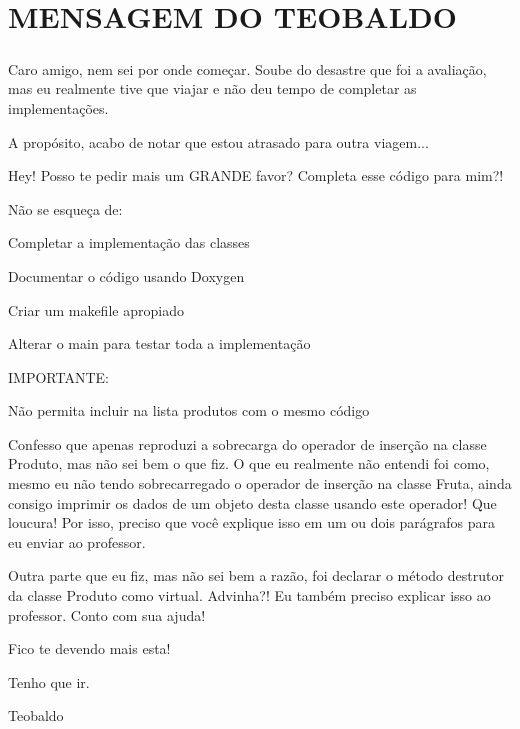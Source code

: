 \section*{M\+E\+N\+S\+A\+G\+EM DO T\+E\+O\+B\+A\+L\+DO}

\subparagraph*{}

Caro amigo, nem sei por onde começar. Soube do desastre que foi a avaliação, mas eu realmente tive que viajar e não deu tempo de completar as implementações.

A propósito, acabo de notar que estou atrasado para outra viagem...

Hey! Posso te pedir mais um G\+R\+A\+N\+DE favor? Completa esse código para mim?!

Não se esqueça de\+:
\begin{DoxyItemize}
\item Completar a implementação das classes
\item Documentar o código usando Doxygen
\item Criar um makefile apropiado
\item Alterar o main para testar toda a implementação
\end{DoxyItemize}

I\+M\+P\+O\+R\+T\+A\+N\+TE\+:
\begin{DoxyItemize}
\item Não permita incluir na lista produtos com o mesmo código
\item Confesso que apenas reproduzi a sobrecarga do operador de inserção na classe Produto, mas não sei bem o que fiz. O que eu realmente não entendi foi como, mesmo eu não tendo sobrecarregado o operador de inserção na classe Fruta, ainda consigo imprimir os dados de um objeto desta classe usando este operador! Que loucura! Por isso, preciso que você explique isso em um ou dois parágrafos para eu enviar ao professor.
\item Outra parte que eu fiz, mas não sei bem a razão, foi declarar o método destrutor da classe Produto como virtual. Advinha?! Eu também preciso explicar isso ao professor. Conto com sua ajuda!
\end{DoxyItemize}

Fico te devendo mais esta!

Tenho que ir.

Teobaldo 